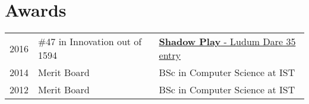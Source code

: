 \documentclass[letterpaper]{deedy-resume} %
\begin{document}
\begin{minipage}[t]{0.64\textwidth}
\section{Awards} 
\begin{tabular}{rll}
	2016	     & \#47 in Innovation out of 1594 & \href{http://ludumdare.com/compo/ludum-dare-35/?uid=90138}{\textbf{Shadow Play} - Ludum Dare 35 entry}\\
	2014	     & Merit Board  & BSc in Computer Science at IST\\
	2012	     & Merit Board  & BSc in Computer Science at IST\\
\end{tabular}


\end{minipage} %








\end{document}

